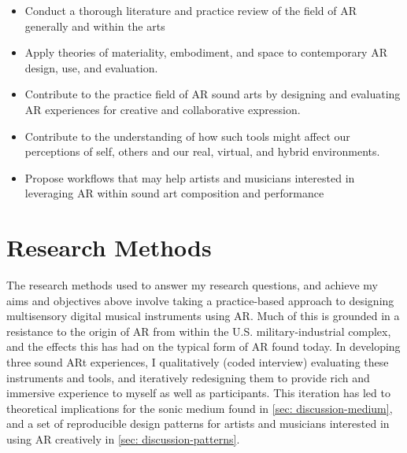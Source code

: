 \begin{itemize}
    \item Conduct a thorough literature and practice review of the field of AR generally and within the arts
    \item Apply theories of materiality, embodiment, and space to contemporary AR design, use, and evaluation.
    \item Contribute to the practice field of AR sound arts by designing and evaluating AR experiences for creative and collaborative expression.
    \item Contribute to the understanding of how such tools might affect our perceptions of self, others and our real, virtual, and hybrid environments. 
    \item Propose workflows that may help artists and musicians interested in leveraging AR within sound art composition and performance
\end{itemize}



\section{Research Methods}\label{sec: introduction-methods}
The research methods used to answer my research questions, and achieve my aims and objectives above involve taking a practice-based approach to designing multisensory digital musical instruments using AR. Much of this is grounded in a resistance to the origin of AR from within the U.S. military-industrial complex, and the effects this has had on the typical form of AR found today. In developing three sound ARt experiences, I  qualitatively (coded interview) evaluating these instruments and tools, and iteratively redesigning them to provide rich and immersive experience to myself as well as participants. This iteration has led to theoretical implications for the sonic medium found in \autoref{sec: discussion-medium}, and a set of reproducible design patterns for artists and musicians interested in using AR creatively in \autoref{sec: discussion-patterns}.




